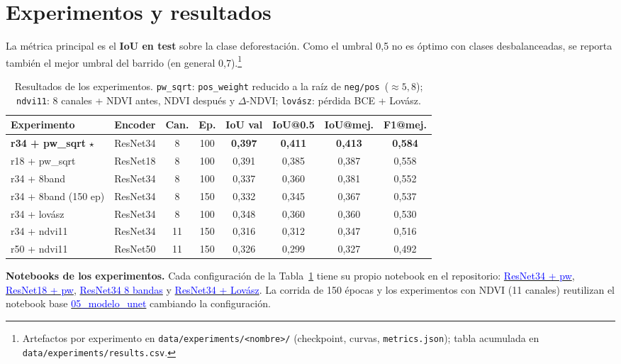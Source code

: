 \documentclass[onecolumn,conference]{IEEEtran}
\newcommand{\repo}{https://github.com/uni-maestria/deep-peru-forest}
\newcommand{\nbexp}[2]{\href{\repo/blob/main/#1.ipynb}{\textcolor{blue}{#2}}}
\begin{document}
\section{Experimentos y resultados}

La métrica principal es el \textbf{IoU en test} sobre la clase deforestación. Como el
umbral 0,5 no es óptimo con clases desbalanceadas, se reporta también el mejor umbral del
barrido (en general 0,7).\footnote{Artefactos por experimento en
\texttt{data/experiments/<nombre>/} (checkpoint, curvas, \texttt{metrics.json}); tabla
acumulada en \texttt{data/experiments/results.csv}.}

\begin{table}[t]
\centering
\small
\setlength{\tabcolsep}{4pt}
\begin{tabular}{@{}lccccccc@{}}
\toprule
\textbf{Experimento} & \textbf{Encoder} & \textbf{Can.} & \textbf{Ep.} &
\textbf{IoU val} & \textbf{IoU@0.5} & \textbf{IoU@mej.} & \textbf{F1@mej.} \\
\midrule
\textbf{r34 + pw\_sqrt} $\star$ & ResNet34 & 8 & 100 & \textbf{0,397} & \textbf{0,411} & \textbf{0,413} & \textbf{0,584} \\
r18 + pw\_sqrt        & ResNet18 & 8  & 100 & 0,391 & 0,385 & 0,387 & 0,558 \\
r34 + 8band           & ResNet34 & 8  & 100 & 0,337 & 0,360 & 0,381 & 0,552 \\
r34 + 8band (150 ep)  & ResNet34 & 8  & 150 & 0,332 & 0,345 & 0,367 & 0,537 \\
r34 + lovász          & ResNet34 & 8  & 100 & 0,348 & 0,360 & 0,360 & 0,530 \\
r34 + ndvi11          & ResNet34 & 11 & 150 & 0,316 & 0,312 & 0,347 & 0,516 \\
r50 + ndvi11          & ResNet50 & 11 & 150 & 0,326 & 0,299 & 0,327 & 0,492 \\
\bottomrule
\end{tabular}
\caption{Resultados de los experimentos. \texttt{pw\_sqrt}: \texttt{pos\_weight} reducido a
la raíz de \texttt{neg/pos}~($\approx 5{,}8$); \texttt{ndvi11}: 8 canales + NDVI antes,
NDVI después y $\Delta$-NDVI; \texttt{lovász}: pérdida BCE + Lovász.}
\label{tab:resultados}
\end{table}

\noindent
\textbf{Notebooks de los experimentos.} Cada configuración de la
Tabla~\ref{tab:resultados} tiene su propio notebook en el repositorio:
\nbexp{05\_modelo\_unet\_resnet34\_8bandas\_pw}{ResNet34 + pw},
\nbexp{05\_modelo\_unet\_resnet18\_8bandas\_pw}{ResNet18 + pw},
\nbexp{05\_modelo\_unet\_resnet34\_8bandas}{ResNet34 8 bandas} y
\nbexp{05\_modelo\_unet\_resnet34\_8bandas\_lovasz}{ResNet34 + Lovász}. La corrida
de 150 épocas y los experimentos con NDVI (11 canales) reutilizan el notebook base
\nbexp{05\_modelo\_unet}{05\_modelo\_unet} cambiando la configuración.
\end{document}
